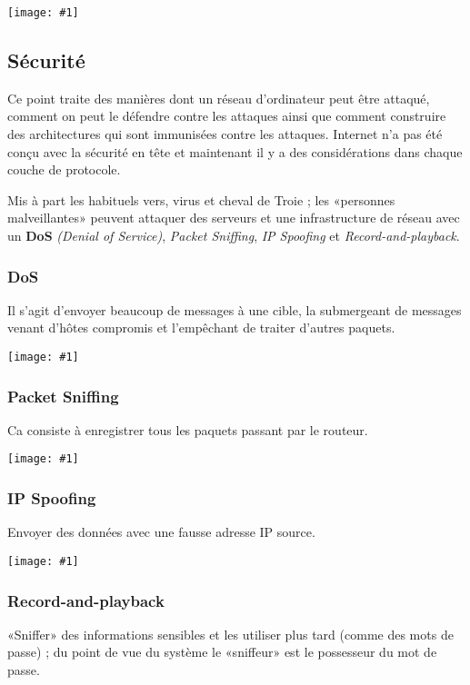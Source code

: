\documentclass{article}
\newcommand{\img}[1]{\begin{center}\texttt{[image: \#1]}\end{center}}
\newcommand{\imgR}[2]{\begin{center}\texttt{[image: \#1]}\end{center}}
\newcommand{\imgRT}[2]{\begin{center}\texttt{[image: \#1]}\end{center}}
\begin{document}
\img{CN_008.png}

\subsection{Sécurité}

Ce point traite des manières dont un réseau d'ordinateur peut être attaqué, comment on peut le défendre contre 
les attaques ainsi que comment construire des architectures qui sont immunisées contre les attaques. Internet n'a
pas été conçu avec la sécurité en tête et maintenant il y a des considérations dans chaque couche de protocole.

Mis à part les habituels vers, virus et cheval de Troie ; les «personnes malveillantes» peuvent attaquer des 
serveurs et une infrastructure de réseau avec un \textbf{DoS} \textit{(Denial of Service)}, \textit{Packet 
Sniffing}, \textit{IP Spoofing} et \textit{Record-and-playback}.

\subsubsection{DoS}

Il s'agit d'envoyer beaucoup de messages à une cible, la submergeant de messages venant d'hôtes compromis et 
l'empêchant de traiter d'autres paquets.

\imgRT{CN_009.png}{150}

\newpage
\subsubsection{Packet Sniffing}

Ca consiste à enregistrer tous les paquets passant par le routeur.

\imgR{CN_010.png}{300}

\subsubsection{IP Spoofing}

Envoyer des données avec une fausse adresse IP source.

\imgR{CN_011.png}{300}

\subsubsection{Record-and-playback}

«Sniffer» des informations sensibles et les utiliser plus tard (comme des mots de passe) ; du point de vue du 
système le «sniffeur» est le possesseur du mot de passe.
\end{document}
